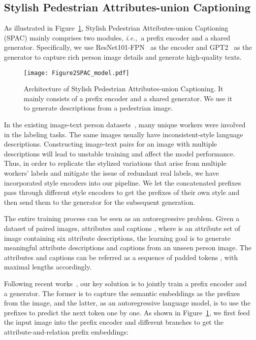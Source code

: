 \documentclass[10pt,twocolumn,letterpaper]{article}
\def\ie{{\it{i.e.,~}}}
\begin{document}
\subsection{Stylish Pedestrian Attributes-union Captioning}
As illustrated in Figure~\ref{fig:SPAC}, Stylish Pedestrian Attributes-union Captioning (SPAC) mainly comprises two modules, \ie a prefix encoder and a shared generator. Specifically, we use ResNet101-FPN~\cite{resnet,fpn} as the encoder and GPT2~\cite{gpt2} as the generator to capture rich person image details and generate high-quality texts.

\begin{figure}
\centering
	\texttt{[image: Figure2SPAC\_model.pdf]}
\caption{Architecture of Stylish Pedestrian Attributes-union Captioning. It mainly consists of a prefix encoder and a shared generator. We use it to generate descriptions from a pedestrian image.}
\label{fig:SPAC}
\end{figure}

In the existing image-text person datasets~\cite{textreid,SSAN}, many unique workers were involved in the labeling tasks. The same images usually have inconsistent-style language descriptions. Constructing image-text pairs for an image with multiple descriptions will lead to unstable training and affect the model performance. Thus, in order to replicate the stylized variations that arise from multiple workers' labels and mitigate the issue of redundant real labels, we have incorporated style encoders into our pipeline. We let the concatenated prefixes pass through different style encoders to get the prefixes of their own style and then send them to the generator for the subsequent generation.

The entire training process can be seen as an autoregressive problem. Given a dataset of paired images, attributes and captions , where  is an attribute set of image  containing six attribute descriptions, the learning goal is to generate meaningful attribute descriptions and captions from an unseen person image. The attributes and captions can be referred as a sequence of padded tokens , with maximal lengths  accordingly. 

Following recent works~\cite{clipcap,zhou2019vlp}, our key solution is to jointly train a prefix encoder and a generator. The former is to capture the semantic embeddings as the prefixes from the image, and the latter, as an autoregressive language model, is to use the prefixes to predict the next token one by one. As shown in Figure~\ref{fig:SPAC}, we first feed the input image  into the prefix encoder  and different branches  to get the  attribute-and-relation prefix embeddings:
\end{document}
